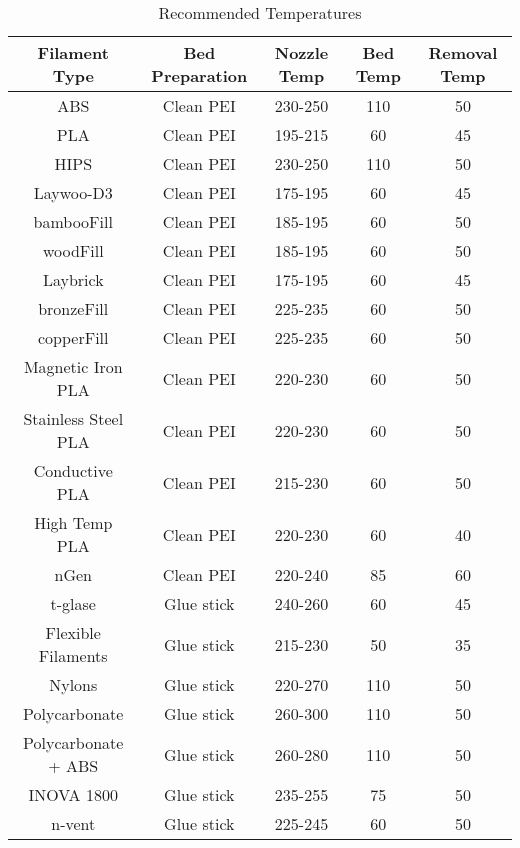 \begin{table}[H]
	\begin{center}
 		\hspace*{-1.5cm}\begin{tabular}{||c c c c c||} 
 		\hline
 		Filament Type & Bed Preparation & Nozzle Temp & Bed Temp & Removal Temp \\ [0.5ex] 
 		\hline\hline
 		ABS & Clean PEI & 230-250 & 110 & 50 \\ 
 		\hline
 		PLA & Clean PEI & 195-215 & 60 & 45\\
 		\hline
 		HIPS & Clean PEI & 230-250 & 110 & 50 \\
 		\hline
 		Laywoo-D3 & Clean PEI & 175-195 & 60 & 45 \\
 		\hline
		bambooFill & Clean PEI & 185-195 & 60 & 50 \\ 
 		\hline
		woodFill & Clean PEI & 185-195 & 60 & 50 \\
 		\hline
 		Laybrick & Clean PEI & 175-195 & 60 & 45 \\
		\hline
		bronzeFill & Clean PEI & 225-235 & 60 & 50 \\
		\hline
		copperFill & Clean PEI & 225-235 & 60 & 50 \\
 		\hline 
 		Magnetic Iron PLA & Clean PEI & 220-230 & 60 & 50 \\
 		\hline
 		Stainless Steel PLA & Clean PEI & 220-230 & 60 & 50 \\
 		\hline
 		Conductive PLA & Clean PEI & 215-230 & 60 & 50 \\
		\hline
		High Temp PLA & Clean PEI & 220-230 & 60 & 40 \\
 		\hline
 		nGen & Clean PEI & 220-240 & 85 & 60 \\
 		\hline
 		t-glase & Glue stick & 240-260 & 60 & 45 \\
 		\hline
 		Flexible Filaments & Glue stick & 215-230 & 50 & 35 \\  
 		\hline
 		Nylons & Glue stick & 220-270 & 110 & 50 \\
 		\hline
 		Polycarbonate & Glue stick & 260-300 & 110 & 50 \\ 
 		\hline
 		Polycarbonate + ABS & Glue stick & 260-280 & 110 & 50 \\
 		\hline
 		INOVA 1800 & Glue stick & 235-255 & 75 & 50 \\
 		\hline
 		n-vent & Glue stick & 225-245 & 60 & 50 \\ [1ex]
 		\hline
 
		\end{tabular}
		\caption{Recommended Temperatures}\label{tab:a}
	\end{center}
\end{table}


